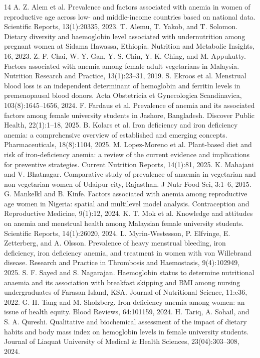 \documentclass{article}
\begin{document}
\begin{thebibliography}{14}
 A. Z. Alem et al. Prevalence and factors associated with anemia in women of reproductive age across low- and middle-income countries based on national data. Scientific Reports, 13(1):20335, 2023.
 T. Alemu, T. Yakob, and T. Solomon. Dietary diversity and haemoglobin level associated with undernutrition among pregnant women at Sidama Hawassa, Ethiopia. Nutrition and Metabolic Insights, 16, 2023.
 Z. F. Chai, W. Y. Gan, Y. S. Chin, Y. K. Ching, and M. Appukutty. Factors associated with anemia among female adult vegetarians in Malaysia. Nutrition Research and Practice, 13(1):23--31, 2019.
 S. Ekroos et al. Menstrual blood loss is an independent determinant of hemoglobin and ferritin levels in premenopausal blood donors. Acta Obstetricia et Gynecologica Scandinavica, 103(8):1645--1656, 2024.
 F. Fardaus et al. Prevalence of anemia and its associated factors among female university students in Jashore, Bangladesh. Discover Public Health, 22(1):1--18, 2025.
 B. Kolars et al. Iron deficiency and iron deficiency anemia: a comprehensive overview of established and emerging concepts. Pharmaceuticals, 18(8):1104, 2025.
 M. Lopez-Moreno et al. Plant-based diet and risk of iron-deficiency anemia: a review of the current evidence and implications for preventive strategies. Current Nutrition Reports, 14(1):81, 2025.
 K. Mahajani and V. Bhatnagar. Comparative study of prevalence of anaemia in vegetarian and non vegetarian women of Udaipur city, Rajasthan. J Nutr Food Sci, 3:1--6, 2015.
 G. Mankelkl and B. Kinfe. Factors associated with anemia among reproductive age women in Nigeria: spatial and multilevel model analysis. Contraception and Reproductive Medicine, 9(1):12, 2024.
 K. T. Mok et al. Knowledge and attitudes on anemia and menstrual health among Malaysian female university students. Scientific Reports, 14(1):26020, 2024.
 L. Myrin-Westesson, P. Elfvinge, E. Zetterberg, and A. Olsson. Prevalence of heavy menstrual bleeding, iron deficiency, iron deficiency anemia, and treatment in women with von Willebrand disease. Research and Practice in Thrombosis and Haemostasis, 9(4):102949, 2025.
 S. F. Sayed and S. Nagarajan. Haemoglobin status to determine nutritional anaemia and its association with breakfast skipping and BMI among nursing undergraduates of Farasan Island, KSA. Journal of Nutritional Science, 11:e36, 2022.
 G. H. Tang and M. Sholzberg. Iron deficiency anemia among women: an issue of health equity. Blood Reviews, 64:101159, 2024.
 H. Tariq, A. Sohail, and S. A. Qureshi. Qualitative and biochemical assessment of the impact of dietary habits and body mass index on hemoglobin levels in female university students. Journal of Liaquat University of Medical \& Health Sciences, 23(04):303--308, 2024.
\end{thebibliography}
\end{document}
